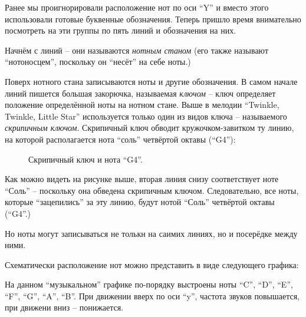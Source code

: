 \documentclass[a4paper,twoside]{book}
\newcounter{example-counter}
\begin{document}
Ранее мы проигнорировали расположение нот по оси ``Y'' и вместо этого
использовали готовые буквенные обозначения. Теперь пришло время внимательно
посмотреть на эти группы по пять линий и обозначения на них.

Начнём с линий -- они называются \emph{нотным станом} (его также называют
``нотоносцем'', поскольку он ``несёт'' на себе ноты.)

Поверх нотного стана записываются ноты и другие обозначения. В самом начале
линий пишется большая закорючка, называемая \emph{ключом} -- ключ определяет
положение определённой ноты на нотном стане. Выше в мелодии ``Twinkle, Twinkle,
Little Star'' используется только один из видов ключа -- называемого
\emph{скрипичным ключом}. Скрипичный ключ обводит кружочком-завитком ту линию,
на которой располагается нота ``соль'' четвёртой октавы (``G4''):

\begin{figure}[ht]
  \caption{Скрипичный ключ и нота ``G4''.}
  \centering
  \label{fig:lilypond-clef-example}
\end{figure}

Как можно видеть на рисунке выше, вторая линия снизу соответствует ноте ``Соль''
-- поскольку она обведена скрипичным ключом. Следовательно, все ноты, которые
``зацепились'' за эту линию, будут нотой ``Соль'' четвёртой октавы (``G4''.)

Но ноты могут записываться не толькн на саимих линиях, но и посерёдке между
ними.

Схематически расположение нот можно представить в виде следующего графика:


На данном ``музыкальном'' графике по-порядку выстроены ноты ``C'', ``D'', ``E'',
``F'', ``G'', ``A'', ``B''. При движении вверх по оси ``y'', частота звуков
повышается, при движени вниз -- понижается.
\end{document}
